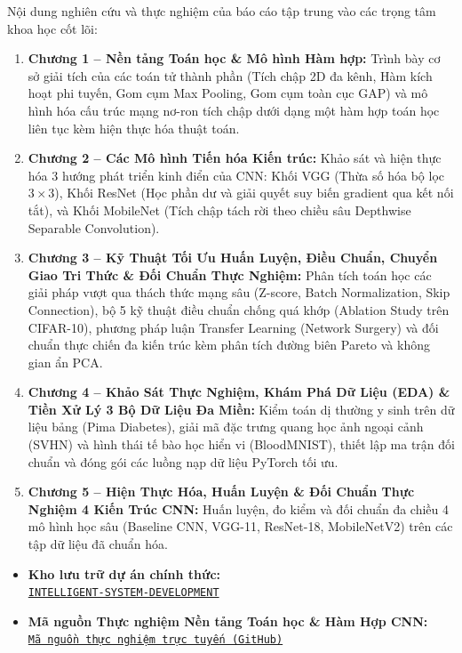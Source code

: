 \documentclass[12pt,a4paper]{report}
\begin{document}
Nội dung nghiên cứu và thực nghiệm của báo cáo tập trung vào các trọng tâm khoa học cốt lõi:
\begin{enumerate}[leftmargin=2em]
    \item \textbf{Chương 1 -- Nền tảng Toán học \& Mô hình Hàm hợp:} Trình bày cơ sở giải tích của các toán tử thành phần (Tích chập 2D đa kênh, Hàm kích hoạt phi tuyến, Gom cụm Max Pooling, Gom cụm toàn cục GAP) và mô hình hóa cấu trúc mạng nơ-ron tích chập dưới dạng một hàm hợp toán học liên tục kèm hiện thực hóa thuật toán.
    \item \textbf{Chương 2 -- Các Mô hình Tiến hóa Kiến trúc:} Khảo sát và hiện thực hóa 3 hướng phát triển kinh điển của CNN: Khối VGG (Thừa số hóa bộ lọc $3\times 3$), Khối ResNet (Học phần dư và giải quyết suy biến gradient qua kết nối tắt), và Khối MobileNet (Tích chập tách rời theo chiều sâu Depthwise Separable Convolution).
    \item \textbf{Chương 3 -- Kỹ Thuật Tối Ưu Huấn Luyện, Điều Chuẩn, Chuyển Giao Tri Thức \& Đối Chuẩn Thực Nghiệm:} Phân tích toán học các giải pháp vượt qua thách thức mạng sâu (Z-score, Batch Normalization, Skip Connection), bộ 5 kỹ thuật điều chuẩn chống quá khớp (Ablation Study trên CIFAR-10), phương pháp luận Transfer Learning (Network Surgery) và đối chuẩn thực chiến đa kiến trúc kèm phân tích đường biên Pareto và không gian ẩn PCA.
    \item \textbf{Chương 4 -- Khảo Sát Thực Nghiệm, Khám Phá Dữ Liệu (EDA) \& Tiền Xử Lý 3 Bộ Dữ Liệu Đa Miền:} Kiểm toán dị thường y sinh trên dữ liệu bảng (Pima Diabetes), giải mã đặc trưng quang học ảnh ngoại cảnh (SVHN) và hình thái tế bào học hiển vi (BloodMNIST), thiết lập ma trận đối chuẩn và đóng gói các luồng nạp dữ liệu PyTorch tối ưu.
    \item \textbf{Chương 5 -- Hiện Thực Hóa, Huấn Luyện \& Đối Chuẩn Thực Nghiệm 4 Kiến Trúc CNN:} Huấn luyện, đo kiểm và đối chuẩn đa chiều 4 mô hình học sâu (Baseline CNN, VGG-11, ResNet-18, MobileNetV2) trên các tập dữ liệu đã chuẩn hóa.
\end{enumerate}

\begin{tcolorbox}[colback=blue!3!white, colframe=blue!75!black, title=\textbf{Kho lưu trữ Mã nguồn Thực nghiệm}]
\small\raggedright
\begin{itemize}[leftmargin=1.5em, itemsep=4pt]
    \item \textbf{Kho lưu trữ dự án chính thức:}\\
    \href{https://github.com/phamtu2x5/INTELLIGENT-SYSTEM-DEVELOPMENT}{\texttt{INTELLIGENT-SYSTEM-DEVELOPMENT}}
    \item \textbf{Mã nguồn Thực nghiệm Nền tảng Toán học \& Hàm Hợp CNN:}\\
    \href{https://github.com/phamtu2x5/INTELLIGENT-SYSTEM-DEVELOPMENT/tree/main/src/Assigment\%2005}{\texttt{Mã nguồn thực nghiệm trực tuyến (GitHub)}}
\end{itemize}
\end{tcolorbox}
\end{document}
